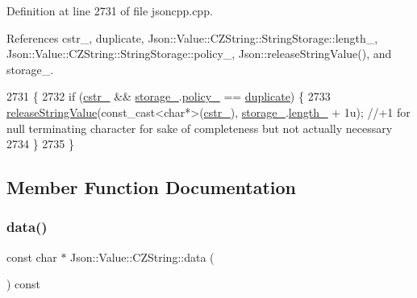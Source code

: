 Definition at line 2731 of file jsoncpp.\+cpp.



References cstr\+\_\+, duplicate, Json\+::\+Value\+::\+C\+Z\+String\+::\+String\+Storage\+::length\+\_\+, Json\+::\+Value\+::\+C\+Z\+String\+::\+String\+Storage\+::policy\+\_\+, Json\+::release\+String\+Value(), and storage\+\_\+.


\begin{DoxyCode}
2731                          \{
2732   \textcolor{keywordflow}{if} (\hyperlink{class_json_1_1_value_1_1_c_z_string_a5b4d28349294034d7f779c3c95d0306c}{cstr\_} && \hyperlink{class_json_1_1_value_1_1_c_z_string_a17c92f0f089a4314e3b1d5695dc1a851}{storage\_}.\hyperlink{struct_json_1_1_value_1_1_c_z_string_1_1_string_storage_a7f68c8d6197c5692a525854b5f29f87b}{policy\_} == \hyperlink{class_json_1_1_value_1_1_c_z_string_a2805c46fb4a72bbaed55de6d75941b6dabb2134294dd8fc37dd82d18bb794fe20}{duplicate}) \{
2733       \hyperlink{namespace_json_a3e0d81d514d0e8bddf33b08074214abd}{releaseStringValue}(const\_cast<char*>(\hyperlink{class_json_1_1_value_1_1_c_z_string_a5b4d28349294034d7f779c3c95d0306c}{cstr\_}), 
      \hyperlink{class_json_1_1_value_1_1_c_z_string_a17c92f0f089a4314e3b1d5695dc1a851}{storage\_}.\hyperlink{struct_json_1_1_value_1_1_c_z_string_1_1_string_storage_a165d865c44e6471d34668eeb4f15b140}{length\_} + 1u); \textcolor{comment}{//+1 for null terminating character for sake of completeness but not
       actually necessary}
2734   \}
2735 \}
\end{DoxyCode}


\subsection{Member Function Documentation}
\mbox{\label{class_json_1_1_value_1_1_c_z_string_af6eee54f8dc43a1203d5af6ba0a5c9a2}} 
\subsubsection{\texorpdfstring{data()}{data()}}
{\footnotesize\ttfamily const char $\ast$ Json\+::\+Value\+::\+C\+Z\+String\+::data (\begin{DoxyParamCaption}{ }\end{DoxyParamCaption}) const}



